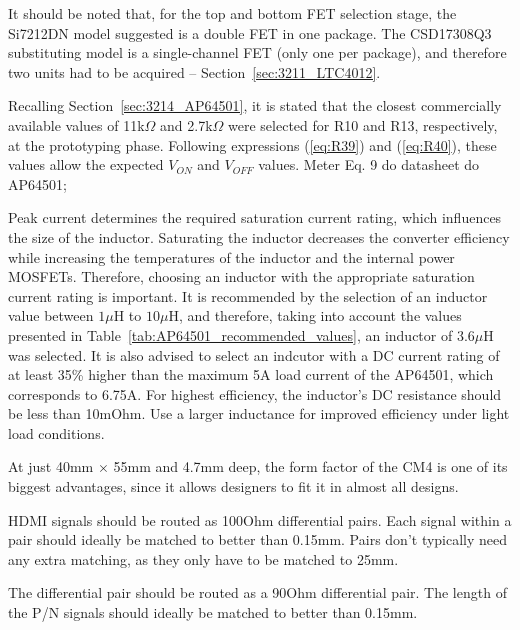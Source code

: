 

It should be noted that, for the top and bottom FET selection stage, the Si7212DN model suggested is a double FET in one package. The CSD17308Q3 substituting model is a single-channel FET (only one per package), and therefore two units had to be acquired -- Section~\ref{sec:3211_LTC4012}.

Recalling Section~\ref{sec:3214_AP64501}, it is stated that the closest commercially available values of 11k$\Omega$ and 2.7k$\Omega$ were selected for R10 and R13, respectively, at the prototyping phase. Following expressions (\ref{eq:R39}) and (\ref{eq:R40}), these values allow the expected $V_{ON}$ and $V_{OFF}$ values.
    Meter Eq. 9 do datasheet do AP64501;
    
    Peak current determines the required saturation current rating, which influences the size of the inductor. Saturating the inductor decreases the converter efficiency while increasing the temperatures of the inductor and the internal power MOSFETs. Therefore, choosing an inductor with the appropriate saturation current rating is important. 
    It is recommended by \cite{AP64501} the selection of an inductor value between $1 \mu$H to $10 \mu$H, and therefore, taking into account the values presented in Table~\ref{tab:AP64501_recommended_values}, an inductor of $3.6 \mu$H was selected. It is also advised to select an indcutor with a DC current rating of at least 35\% higher than the maximum 5A load current of the AP64501, which corresponds to 6.75A.
    For highest efficiency, the inductor's DC resistance should be less than 10mOhm. Use a larger inductance for improved efficiency under light load conditions.


    At just 40mm $\times$ 55mm and 4.7mm deep, the form factor of the CM4 is one of its biggest advantages, since it allows designers to fit it in almost all designs.

    HDMI signals should be routed as 100Ohm differential pairs. Each signal within a pair should ideally be matched to better than 0.15mm. Pairs don't typically need any extra matching, as they only have to be matched to 25mm.

    The differential pair should be routed as a 90Ohm differential pair. The length of the P/N signals should ideally be matched to better than 0.15mm.

